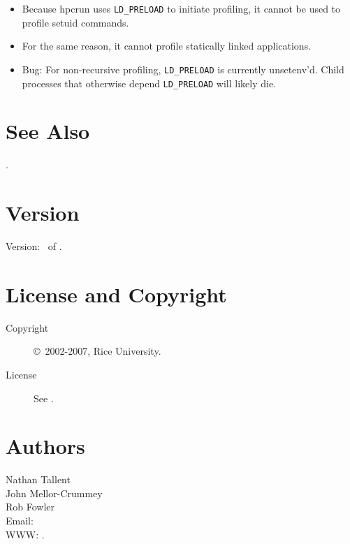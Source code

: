 \documentclass[english]{article}
\begin{document}
\begin{itemize}
  \item Because hpcrun uses \verb+LD_PRELOAD+ to initiate profiling, it cannot be used to profile setuid commands.
  \item For the same reason, it cannot profile statically linked applications.
  \item Bug: For non-recursive profiling, \verb+LD_PRELOAD+ is currently unsetenv'd.  Child processes that otherwise depend \verb+LD_PRELOAD+ will likely die.
\end{itemize}


\section{See Also}

.

\section{Version}

Version: \Version\ of \Date.

\section{License and Copyright}

\begin{description}
\item[Copyright] \copyright\ 2002-2007, Rice University.
\item[License] See .
\end{description}

\section{Authors}

\noindent
Nathan Tallent \\
John Mellor-Crummey \\
Rob Fowler \\
Email:  \\
WWW: .

\LatexManEnd
\end{document}
